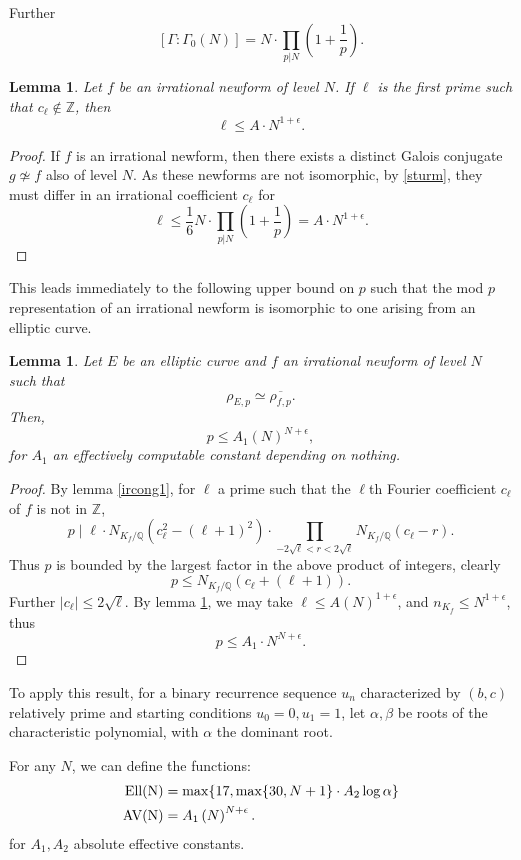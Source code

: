 \documentclass[12pt]{amsart}
\newtheorem{lem}[thm]{Lemma}
\theoremstyle{definition}
\def\Z{{\mathbb Z}}
\renewcommand{\bar}{\overline}
\newcommand{\Ell}{\rm Ell}
\newcommand{\AV}{\rm AV}
\begin{document}
Further 
\[ [\Gamma : \Gamma_0(N)] = N \cdot \prod_{p|N} \left(1 + \frac{1}{p} \right). \]

\begin{lem}\label{boundell}
Let $f$ be an irrational newform of level $N$.  If $\ell$ is the first prime such that $c_\ell \not\in \Z$, then
\[ \ell \leq A \cdot N^{1+\epsilon} .\]
\end{lem}

\begin{proof}
If $f$ is an irrational newform, then there exists a distinct Galois conjugate $g \not \simeq f$ also of level $N$.  As these newforms are not isomorphic, by \ref{sturm}, they must differ in an irrational coefficient $c_\ell$ for
\[ \ell \leq \frac{1}{6} N \cdot \prod_{p|N} \left(1 + \frac{1}{p} \right) = A \cdot N^{1+\epsilon}. \]
\end{proof}

This leads immediately to the following upper bound on $p$ such that the mod $p$ representation of an irrational newform is isomorphic to one arising from an elliptic curve.

\begin{lem}\label{irboundp}
Let $E$ be an elliptic curve and $f$ an irrational newform of level $N$ such that 
\[\rho_{E,p} \simeq \bar{\rho_{f,p}}.\]
Then, 
\[ p \leq  A_1 \left( N \right)^{N+\epsilon}, \]
for $A_1$ an effectively computable constant depending on nothing.
\end{lem}
\begin{proof}
By lemma \ref{ircong1}, for $\ell$ a prime such that the $\ell$th Fourier coefficient $c_\ell$ of $f$ is not in $\Z$, 
\[ p \mid \ell \cdot N_{K_f / \mathbb{Q}}(c_\ell^2-(\ell+1)^2) \cdot \prod_{-2\sqrt{\ell} < r < 2\sqrt{\ell}}{N_{K_f / \mathbb{Q}}}(c_\ell - r).\]
Thus $p$ is bounded by the largest factor in the above product of integers, clearly
\[ p \leq N_{K_f / \mathbb{Q}}(c_\ell+(\ell+1)) .\]
Further $|c_\ell| \leq 2\sqrt{\ell}$.  By lemma \ref{boundell}, we may take $\ell \leq A \left( N \right)^{1+\epsilon}$, and $n_{K_f} \leq N^{1+\epsilon}$, thus
\[ p \leq A_1 \cdot N^{N+\epsilon}. \]
\end{proof}

To apply this result, for a binary recurrence sequence $u_n$ characterized by $(b,c)$ relatively prime and starting conditions $u_0=0,u_1=1$, let $\alpha,\beta$ be roots of the characteristic polynomial, with $\alpha$ the dominant root.  

For any $N$, we can define the functions:
\begin{align*}
\Ell(N) & = \max\{17, \max\{30, N+1\} \cdot A_2\log{\alpha} \} \\
\AV(N) & = A_1 \left( N \right)^{N + \epsilon}. 
\end{align*}
for $A_1,A_2$ absolute effective constants.
\end{document}
